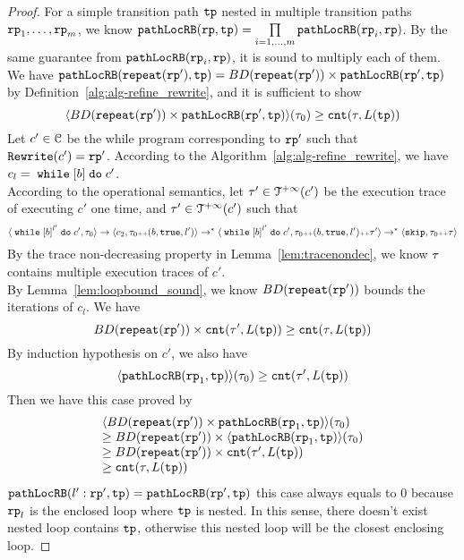 \begin{proof}
{  For a simple transition path $\mathtt{tp}$ nested in multiple transition paths $\mathtt{rp}_1, \ldots, \mathtt{rp}_m$,
  we know $\mathtt{pathLocRB}(\mathtt{rp}, \mathtt{tp}) = \prod\limits_{i = 1, \ldots, m}\mathtt{pathLocRB}(\mathtt{rp}_i, \mathtt{rp})$.
  By the same guarantee from $\mathtt{pathLocRB}(\mathtt{rp}_i, \mathtt{rp})$, it is sound to multiply each of them.
}
\\
We have $\mathtt{pathLocRB}(\mathtt{repeat}(\mathtt{rp}'), \mathtt{tp}) = BD(\mathtt{repeat}(\mathtt{rp}')) \times \mathtt{pathLocRB}(\mathtt{rp}', \mathtt{tp})$
by Definition~\ref{alg:alg-refine_rewrite}, and
it is sufficient to show
\[
  \langle  BD(\mathtt{repeat}(\mathtt{rp}')) \times \mathtt{pathLocRB}(\mathtt{rp}', \mathtt{tp}) \rangle (\mathtt{\tau}_0) \geq \mathtt{cnt}(\mathtt{\tau}, L(\mathtt{tp})) 
\]
Let $c' \in \mathcal{C}$ be the while program corresponding to $\mathtt{rp}'$ such that $\mathtt{Rewrite}(c') = \mathtt{rp}'$.
According to the Algorithm~\ref{alg:alg-refine_rewrite}, we have $c_l = \ewhile \clabel{\bexpr} \edo c'$.
\\
According to the operational semantics, let $\mathtt{\tau}' \in \mathcal{T}^{+\infty}(c')$ be the execution trace of executing $c'$ one time,
and $\mathtt{\tau}' \in \mathcal{T}^{+\infty}(c')$  such that 
\[
  \config{\ewhile \clabel{\bexpr}^{l'} \edo c', \trace_0} \to \config{c_2, \trace_0 \tracecat (\bexpr, \etrue, l')} \to^* \config{\ewhile \clabel{\bexpr}^{l'} \edo c', \trace_0 \tracecat (\bexpr, \etrue, l') \tracecat \trace'}
  \to^* \config{\eskip, \trace_0 \tracecat \trace}
\]
By the trace non-decreasing property in Lemma~\ref{lem:tracenondec}, we know $\mathtt{\tau}$ contains multiple execution traces of $c'$.
\\
By Lemma~\ref{lem:loopbound_sound}, we know $BD(\mathtt{repeat}(\mathtt{rp}'))$ bounds the iterations of $c_l$. We have
\[
  BD(\mathtt{repeat}(\mathtt{rp}')) \times \mathtt{cnt}(\mathtt{\tau}', L(\mathtt{tp}))  \geq \mathtt{cnt}(\mathtt{\tau}, L(\mathtt{tp})) 
\]
By induction hypothesis on $c'$, we also have
\[
  \langle \mathtt{pathLocRB}(\mathtt{rp}_1, \mathtt{tp}) \rangle(\mathtt{\tau}_0) \geq \mathtt{cnt}(\mathtt{\tau}', L(\mathtt{tp})) 
\]
Then we have this case proved by
\[
  \begin{array}{l}
  \langle BD(\mathtt{repeat}(\mathtt{rp}')) \times \mathtt{pathLocRB}(\mathtt{rp}_1, \mathtt{tp}) \rangle(\mathtt{\tau}_0) 
  \\
  \geq
  BD(\mathtt{repeat}(\mathtt{rp}')) \times \langle \mathtt{pathLocRB}(\mathtt{rp}_1, \mathtt{tp}) \rangle(\mathtt{\tau}_0) 
  \\
  \geq BD(\mathtt{repeat}(\mathtt{rp}')) \times \mathtt{cnt}(\mathtt{\tau}', L(\mathtt{tp}))  
  \\
  \geq \mathtt{cnt}(\mathtt{\tau}, L(\mathtt{tp})) 
  \end{array}
  \]
$\mathtt{pathLocRB}(l': \mathtt{rp}', \mathtt{tp}) = \mathtt{pathLocRB}(\mathtt{rp}', \mathtt{tp})$ 
this case always equals to $0$ because $\mathtt{rp}_l$ is the enclosed loop where $\mathtt{tp}$ is nested. In this sense, there doesn't exist nested loop contains $\mathtt{tp}$, otherwise this nested loop will be the closest enclosing loop.

\end{proof}